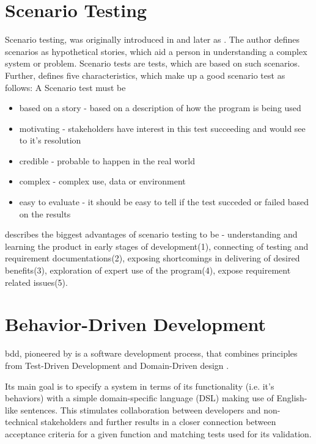 \section{Scenario Testing}
Scenario testing, was originally introduced in \textcite{kaner2003power} and later as \textcite{kaner2013introduction}. The author defines scenarios as hypothetical stories, which aid a person in understanding a complex system or problem. Scenario tests are tests, which are based on such scenarios.  \parencite[1]{kaner2013introduction}
Further, \parencite[2-5]{kaner2003power} defines five characteristics, which make up a good scenario test as follows:
A Scenario test must be
\begin{itemize}
     \item based on a story - based on a description of how the program is being used
    \item motivating - stakeholders have interest in this test succeeding and would see to it's resolution
    \item credible - probable to happen in the real world
    \item complex - complex use, data or environment
    \item easy to evaluate - it should be easy to tell if the test succeded or failed based on the results 
\end{itemize}

\textcite{kaner2013introduction} describes the biggest advantages of scenario testing to be  - understanding and learning the product in early stages of development(1), connecting of testing and requirement documentations(2), exposing shortcomings in delivering of desired benefits(3), exploration of expert use of the program(4), expose requirement related issues(5).

\section{Behavior-Driven Development}
\label{fundamentals:bdd}
\gls{bdd}, pioneered by \textcite{north2006behavior} is a software development
process, that combines principles from Test-Driven Development and Domain-Driven design \parencite{evans2004domain}.

Its main goal is to specify a system in terms of its functionality (i.e. it's behaviors) with a simple domain-specific language (DSL) making use of English-like sentences. This stimulates collaboration between developers and non-technical stakeholders and further results in a closer connection between acceptance criteria for a given function and matching tests used for its validation.


